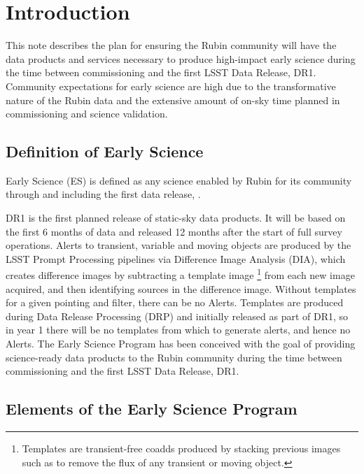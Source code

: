 \section{Introduction}

This note describes the plan for ensuring the Rubin community will have the data products and services necessary to produce high-impact early science during the time between commissioning and the first LSST Data Release, DR1.  
Community expectations for early science are high due to the transformative nature of the Rubin data and the extensive amount of on-sky time planned in commissioning and science validation.

\subsection{Definition of Early Science}  \label{ssec:defn}

Early Science (ES) is defined as any science enabled by Rubin for its community through and including the first data release, \drone.

DR1 is the first planned release of static-sky data products. 
It will be based on the first 6 months of data and released 12 months after the start of full survey operations.  
Alerts to transient, variable and moving objects are produced by the LSST Prompt Processing pipelines via Difference Image Analysis (DIA), which creates difference images by subtracting a template image \footnote{Templates are transient-free coadds produced by stacking previous images such as to remove the flux of any transient or moving object.} from each new image acquired, and then identifying sources in the difference image. 
Without templates for a given pointing and filter, there can be no Alerts.
Templates are produced during Data Release Processing (DRP) and initially released as part of DR1, so in year 1 there will be no templates from which to generate alerts, and hence no Alerts.
The Early Science Program has been conceived with the goal of providing science-ready data products to the Rubin community during the time between commissioning and the first LSST Data Release, DR1.

\subsection{Elements of the Early Science Program}

